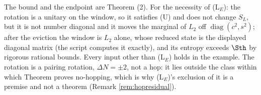 The bound and the endpoint are Theorem (2). For the necessity of (L$_E$): the rotation is a unitary on the window, so it satisfies (U) and does not change $S_L$, but it is not number diagonal and it moves the marginal of $L_2$ off $\operatorname{diag}(c^{2}, s^{2})$; after the eviction the window is $L_2$ alone, whose reduced state is the displayed diagonal matrix (the script computes it exactly), and its entropy exceeds $\Sth$ by rigorous rational bounds. Every input other than (L$_E$) holds in the example. The rotation is a pairing rotation, $\Delta N = \pm 2$, not a hop: it lies outside the class within which Theorem  proves no-hopping, which is why (L$_E$)'s exclusion of it is a premise and not a theorem (Remark \ref{rem:hopresidual}).
